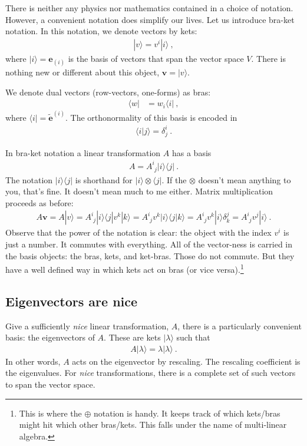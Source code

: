 \documentclass[12pt]{article}
\numberwithin{equation}{section}    %
\renewcommand{\tilde}{\widetilde}   %
\renewcommand{\vec}[1]{\mathbf{#1}} %
\begin{document}
There is neither any physics nor mathematics contained in a choice of notation. However, a convenient notation does simplify our lives. Let us introduce bra-ket notation. In this notation, we denote vectors by kets:
\begin{align}
  |v\rangle = v^i|i\rangle \ ,
\end{align}
where $|i\rangle = \vec{e}_{(i)}$ is the basis of vectors that span the vector space $V$. There is nothing new or different about this object,  $\vec{v} = |v \rangle$.

We denote dual vectors (row-vectors, one-forms) as bras:
\begin{align}
  \langle w | &= w_i \langle i| \ ,
\end{align}
where $\langle i | = \tilde{\vec{e}}^{(i)}$. The orthonormality of this basis is encoded in 
\begin{align}
  \langle i | j \rangle = \delta^i_j \ .
\end{align}

In bra-ket notation a linear transformation $A$ has a basis
\begin{align}
  A = A^i_{\phantom{i}j} |i\rangle \langle j| \ .
\end{align}
The notation $|i\rangle \langle j|$ is shorthand for $|i\rangle \otimes \langle j|$. If the $\otimes$ doesn’t mean anything to you, that’s fine. It doesn’t mean much to me either. Matrix multiplication proceeds as before:
\begin{align}
  A\vec{v} = A|v\rangle = 
  A^i_{\phantom{i}j} |i\rangle \langle j| v^k |k \rangle
  = 
  A^i_{\phantom{i}j}  v^k  |i\rangle \langle j|k \rangle
  = 
  A^i_{\phantom{i}j}  v^k  |i\rangle \delta^j_k
  = 
  A^i_{\phantom{i}j}  v^j  |i\rangle \ .
\end{align}
Observe that the power of the notation is clear: the object with the index $v^i$ is just a number. It commutes with everything. All of the vector-ness is carried in the basis objects: the bras, kets, and ket-bras. Those do not commute. But they have a well defined way in which kets act on bras (or vice versa).\footnote{This is where the $\oplus$ notation is handy. It keeps track of which kets/bras might hit which other bras/kets. This falls under the name of multi-linear algebra.}


\subsection{Eigenvectors are nice}

Give a sufficiently \emph{nice} linear transformation, $A$, there is a particularly convenient basis: the eigenvectors of $A$. These are kets $|\lambda\rangle$ such that
\begin{align}
  A |\lambda\rangle = \lambda |\lambda\rangle \ .
\end{align}
In other words, $A$ acts on the eigenvector by rescaling. The rescaling coefficient is the eigenvalues. For \emph{nice} transformations, there is a complete set of such vectors to span the vector space.
\end{document}
